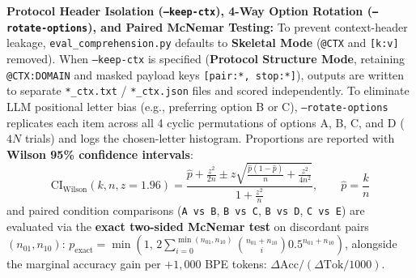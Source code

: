 \documentclass[9pt,a4paper]{extarticle}
\begin{document}
\textbf{Protocol Header Isolation (\texttt{--keep-ctx}), 4-Way Option Rotation (\texttt{--rotate-options}), and Paired McNemar Testing:} To prevent context-header leakage, \texttt{eval\_comprehension.py} defaults to \textbf{Skeletal Mode} (\texttt{@CTX} and \texttt{[k:v]} removed). When \texttt{--keep-ctx} is specified (\textbf{Protocol Structure Mode}, retaining \texttt{@CTX:DOMAIN} and masked payload keys \texttt{[pair:*, stop:*]}), outputs are written to separate \texttt{*\_ctx.txt} / \texttt{*\_ctx.json} files and scored independently. To eliminate LLM positional letter bias (e.g., preferring option B or C), \texttt{--rotate-options} replicates each item across all 4 cyclic permutations of options A, B, C, and D ($4N$ trials) and logs the chosen-letter histogram. Proportions are reported with \textbf{Wilson 95\% confidence intervals}:
\begin{equation}
  \text{CI}_{\text{Wilson}}(k, n, z=1.96) = \frac{\hat{p} + \frac{z^2}{2n} \pm z\sqrt{\frac{\hat{p}(1-\hat{p})}{n} + \frac{z^2}{4n^2}}}{1 + \frac{z^2}{n}}, \qquad \hat{p} = \frac{k}{n}
  \label{eq:wilson}
\end{equation}
and paired condition comparisons (\texttt{A vs B}, \texttt{B vs C}, \texttt{B vs D}, \texttt{C vs E}) are evaluated via the \textbf{exact two-sided McNemar test} on discordant pairs $(n_{01}, n_{10})$: $p_{\text{exact}} = \min\!\left(1,\, 2\sum_{i=0}^{\min(n_{01}, n_{10})} \binom{n_{01}+n_{10}}{i} 0.5^{n_{01}+n_{10}}\right)$, alongside the marginal accuracy gain per $+1{,}000$ BPE tokens: $\Delta\text{Acc} / (\Delta\text{Tok}/1000)$.
\end{document}
